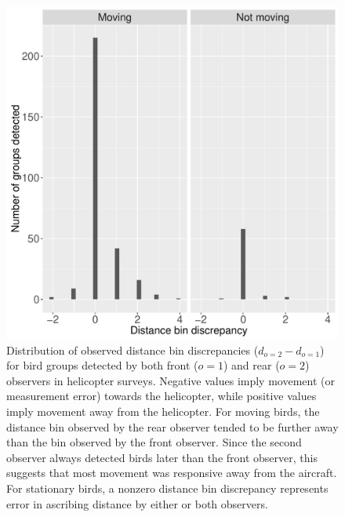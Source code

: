 \documentclass[aoas,preprint]{imsart}
\numberwithin{equation}{section}
\theoremstyle{plain}
\begin{document}
\begin{figure}
\begin{center}
\includegraphics[width=150mm]{Dist_error_hists_JABES.pdf}
\caption{Distribution of observed distance bin discrepancies ($d_{o=2} - d_{o=1}$) for bird groups detected by both front ($o=1$) and rear ($o=2$) observers in helicopter surveys. Negative values imply movement (or measurement error) towards the helicopter, while positive values imply movement away from the helicopter. For moving birds, the distance bin observed by the rear observer tended to be further away than the bin observed by the front observer.  Since the second observer always detected birds later than the front observer, this suggests that most movement was responsive away from the aircraft. For stationary birds, a nonzero distance bin discrepancy represents error in ascribing distance by either or both observers.}
\label{fig:dist_hists}
\end{center}
\end{figure}
\end{document}
